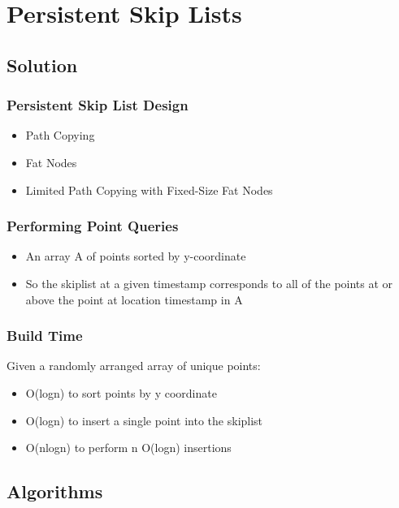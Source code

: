 \documentclass{beamer}
\begin{document}
\section{Persistent Skip Lists}

\subsection{Solution}

\begin{frame}
  \frametitle{Persistent Skip List Design}

  \begin{itemize}
  \item
    Path Copying
  \item
    Fat Nodes
  \item
    Limited Path Copying with Fixed-Size Fat Nodes
  \end{itemize}

\end{frame}

\begin{frame}
  \frametitle{Performing Point Queries}

  \begin{itemize}
  \item
    An array A of points sorted by y-coordinate
  \item
    So the skiplist at a given timestamp corresponds to all of the points at or
    above the point at location timestamp in A
  \end{itemize}

\end{frame}

\begin{frame}
  \frametitle{Build Time}

  Given a randomly arranged array of unique points:
  \begin{itemize}
  \item
    O(logn) to sort points by y coordinate
  \item
    O(logn) to insert a single point into the skiplist
  \item
    O(nlogn) to perform n O(logn) insertions
  \end{itemize}

\end{frame}

\subsection{Algorithms}
\end{document}
